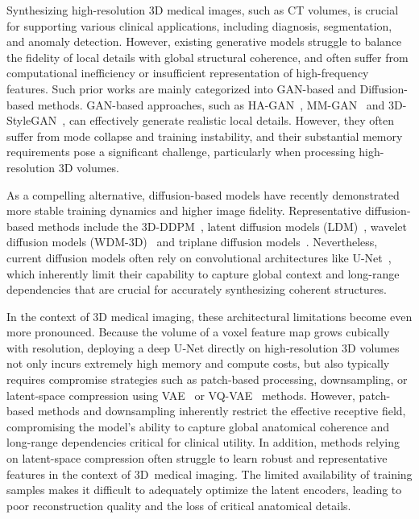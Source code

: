 Synthesizing high-resolution 3D medical images, such as CT volumes, is crucial for supporting various clinical applications, including diagnosis, segmentation, and anomaly detection. However, existing generative models struggle to balance the fidelity of local details with global structural coherence, and often suffer from computational inefficiency or insufficient representation of high-frequency features. 
Such prior works are mainly categorized into GAN-based and Diffusion-based methods. GAN-based approaches, such as HA-GAN~\citep{sun2022hierarchical}, MM-GAN~\citep{sun2020mm} and 3D-StyleGAN~\citep{hong20213d}, can effectively generate realistic local details. 
However, they often suffer from mode collapse and training instability, and their substantial memory requirements pose a significant challenge, particularly when processing high-resolution 3D volumes.

As a compelling alternative, diffusion-based models have recently demonstrated more stable training dynamics and higher image fidelity. Representative diffusion-based methods include the 3D-DDPM~\citep{dorjsembe2022three}, latent diffusion models (LDM)~\citep{khader2023medical,pinaya2022brain,rombach2022high}, wavelet diffusion models (WDM-3D)~\citep{friedrich2024wdm} and triplane diffusion models~\citep{zhang2025tcam}. Nevertheless, current diffusion models often rely on convolutional architectures like U-Net~\citep{ronneberger2015u}, which inherently limit their capability to capture global context and long-range dependencies that are crucial for accurately synthesizing coherent structures. 

In the context of 3D medical imaging, these architectural limitations become even more pronounced. Because the volume of a voxel feature map grows cubically with resolution, deploying a deep U‑Net directly on high‑resolution 3D volumes not only incurs extremely high memory and compute costs, but also typically requires compromise strategies such as patch‑based processing, downsampling, or latent-space compression using VAE~\citep{kingma2013auto} or VQ-VAE~\citep{van2017neural} methods. However, patch-based methods and downsampling inherently restrict the effective receptive field, compromising the model’s ability to capture global anatomical coherence and long-range dependencies critical for clinical utility. 
In addition, methods relying on latent-space compression often struggle to learn robust and representative features in the context of 3D~medical imaging. The limited availability of training samples makes it difficult to adequately optimize the latent encoders, leading to poor reconstruction quality and the loss of critical anatomical details.

